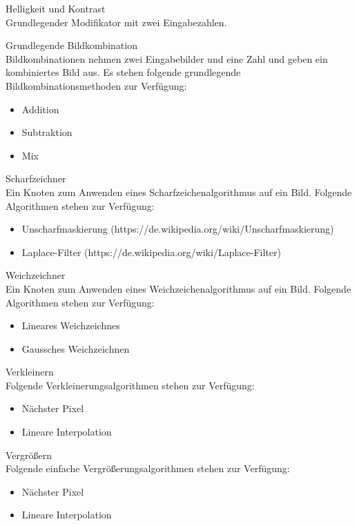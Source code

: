 \begin{speclist}[F]
\setcounter{specnum}{22010}

\spec Helligkeit und Kontrast \\
Grundlegender Modifikator mit zwei Eingabezahlen.

\spec Grundlegende Bildkombination \\
Bildkombinationen nehmen zwei Eingabebilder und eine Zahl und geben ein kombiniertes Bild aus. Es stehen folgende grundlegende Bildkombinationsmethoden zur Verfügung:
\begin{itemize}
	\item Addition
	\item Subtraktion
	\item Mix
\end{itemize}

\spec Scharfzeichner \\
Ein Knoten zum Anwenden eines Scharfzeichenalgorithmus auf ein Bild. Folgende Algorithmen stehen zur Verfügung:
\begin{itemize}
	\item Unscharfmaskierung (https://de.wikipedia.org/wiki/Unscharfmaskierung)
	\item Laplace-Filter (https://de.wikipedia.org/wiki/Laplace-Filter)
\end{itemize}

\spec Weichzeichner \\
Ein Knoten zum Anwenden eines Weichzeichenalgorithmus auf ein Bild. Folgende Algorithmen stehen zur Verfügung:
\begin{itemize}
	\item Lineares Weichzeichnes
	\item Gaussches Weichzeichnen
\end{itemize}

\optspec Verkleinern \\
Folgende Verkleinerungsalgorithmen stehen zur Verfügung:
\begin{itemize}
	\item Nächster Pixel
	\item Lineare Interpolation
\end{itemize}

\optspec Vergrößern \\
Folgende einfache Vergrößerungsalgorithmen stehen zur Verfügung:
\begin{itemize}
	\item Nächster Pixel
	\item Lineare Interpolation
\end{itemize}


\end{speclist}
